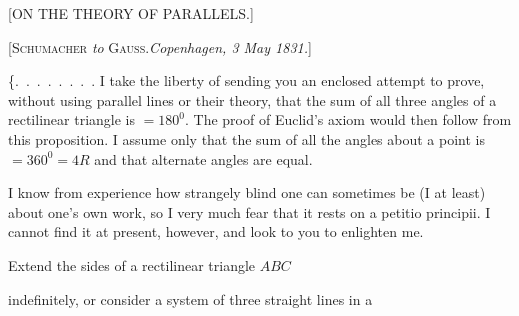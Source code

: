 

\clearpage
{}%
\begin{center}
[ON THE THEORY OF PARALLELS.]

[\textsc{Schumacher} \emph{to} \textsc{Gauss}.\quad \emph{Copenhagen, 3 May 1831.}]
\end{center}

\{\mbox{.\ .\ .\ .\ .\ .\ .\ .} I take the liberty of sending you an enclosed attempt to prove, without using parallel lines or their theory, that the sum of all three angles of a rectilinear triangle is $= 180^{0}$. The proof of Euclid's axiom would then follow from this proposition. I assume only that the sum of all the angles about a point is $= 360^{0} = 4R$ and that alternate angles are equal.

I know from experience how strangely blind one can sometimes be (I at least) about one's own work, so I very much fear that it rests on a petitio principii. I cannot find it at present, however, and look to you to enlighten me.

\textls{[Enclosure.]} Extend the sides of a rectilinear triangle $ABC$

\begin{center}

\par [Fig. 1.]
\end{center}

\noindent indefinitely, or consider a system of three straight lines in a
